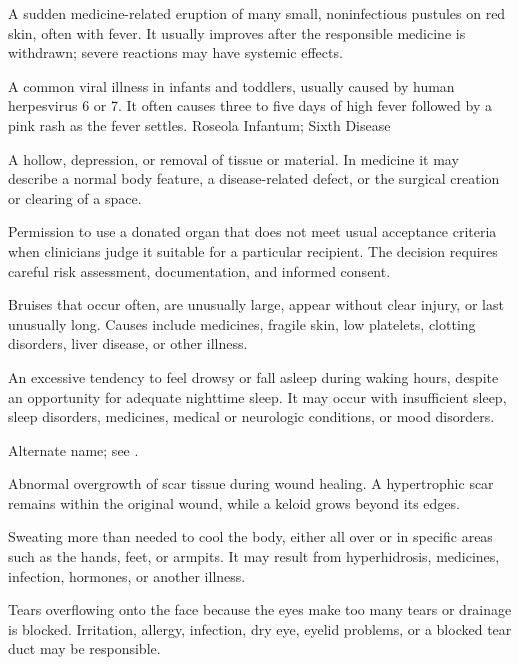  A sudden medicine-related eruption of many small, noninfectious pustules on red skin, often with fever. It usually improves after the responsible medicine is withdrawn; severe reactions may have systemic effects.

 A common viral illness in infants and toddlers, usually caused by human herpesvirus 6 or 7. It often causes three to five days of high fever followed by a pink rash as the fever settles.
\synonyms
Roseola Infantum; Sixth Disease

 A hollow, depression, or removal of tissue or material. In medicine it may describe a normal body feature, a disease-related defect, or the surgical creation or clearing of a space.

 Permission to use a donated organ that does not meet usual acceptance criteria when clinicians judge it suitable for a particular recipient. The decision requires careful risk assessment, documentation, and informed consent.

 Bruises that occur often, are unusually large, appear without clear injury, or last unusually long. Causes include medicines, fragile skin, low platelets, clotting disorders, liver disease, or other illness.

 An excessive tendency to feel drowsy or fall asleep during waking hours, despite an opportunity for adequate nighttime sleep. It may occur with insufficient sleep, sleep disorders, medicines, medical or neurologic conditions, or mood disorders.

 Alternate name; see .

 Abnormal overgrowth of scar tissue during wound healing. A hypertrophic scar remains within the original wound, while a keloid grows beyond its edges.

 Sweating more than needed to cool the body, either all over or in specific areas such as the hands, feet, or armpits. It may result from hyperhidrosis, medicines, infection, hormones, or another illness.

 Tears overflowing onto the face because the eyes make too many tears or drainage is blocked. Irritation, allergy, infection, dry eye, eyelid problems, or a blocked tear duct may be responsible.

